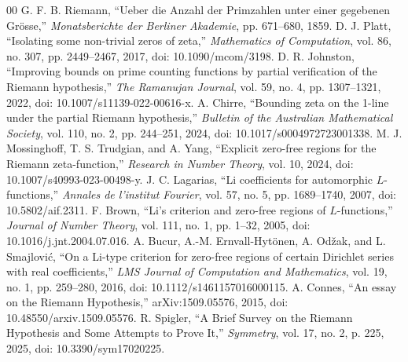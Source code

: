 \documentclass[conference]{../../../../Conference-LaTeX-template_10-17-19/IEEEtran}
\begin{document}
\begin{thebibliography}{00}
 G. F. B. Riemann, ``Ueber die Anzahl der Primzahlen unter einer gegebenen Grösse,'' \emph{Monatsberichte der Berliner Akademie}, pp. 671--680, 1859.
 D. J. Platt, ``Isolating some non-trivial zeros of zeta,'' \emph{Mathematics of Computation}, vol. 86, no. 307, pp. 2449--2467, 2017, doi: 10.1090/mcom/3198.
 D. R. Johnston, ``Improving bounds on prime counting functions by partial verification of the Riemann hypothesis,'' \emph{The Ramanujan Journal}, vol. 59, no. 4, pp. 1307--1321, 2022, doi: 10.1007/s11139-022-00616-x.
 A. Chirre, ``Bounding zeta on the 1-line under the partial Riemann hypothesis,'' \emph{Bulletin of the Australian Mathematical Society}, vol. 110, no. 2, pp. 244--251, 2024, doi: 10.1017/s0004972723001338.
 M. J. Mossinghoff, T. S. Trudgian, and A. Yang, ``Explicit zero-free regions for the Riemann zeta-function,'' \emph{Research in Number Theory}, vol. 10, 2024, doi: 10.1007/s40993-023-00498-y.
 J. C. Lagarias, ``Li coefficients for automorphic $L$-functions,'' \emph{Annales de l'institut Fourier}, vol. 57, no. 5, pp. 1689--1740, 2007, doi: 10.5802/aif.2311.
 F. Brown, ``Li's criterion and zero-free regions of $L$-functions,'' \emph{Journal of Number Theory}, vol. 111, no. 1, pp. 1--32, 2005, doi: 10.1016/j.jnt.2004.07.016.
 A. Bucur, A.-M. Ernvall-Hytönen, A. Odžak, and L. Smajlović, ``On a Li-type criterion for zero-free regions of certain Dirichlet series with real coefficients,'' \emph{LMS Journal of Computation and Mathematics}, vol. 19, no. 1, pp. 259--280, 2016, doi: 10.1112/s1461157016000115.
 A. Connes, ``An essay on the Riemann Hypothesis,'' arXiv:1509.05576, 2015, doi: 10.48550/arxiv.1509.05576.
 R. Spigler, ``A Brief Survey on the Riemann Hypothesis and Some Attempts to Prove It,'' \emph{Symmetry}, vol. 17, no. 2, p. 225, 2025, doi: 10.3390/sym17020225.
\end{thebibliography}
\end{document}
